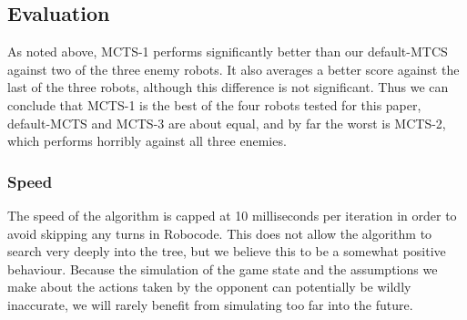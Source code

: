 \subsection{Evaluation}
As noted above, MCTS-1 performs significantly better than our default-MTCS against two of the three enemy robots. It also averages a better score against the last of the three robots, although this difference is not significant. Thus we can conclude that MCTS-1 is the best of the four robots tested for this paper, default-MCTS and MCTS-3 are about equal, and by far the worst is MCTS-2, which performs horribly against all three enemies.

\subsubsection{Speed}
The speed of the algorithm is capped at 10 milliseconds per iteration in order to avoid skipping any turns in Robocode. This does not allow the algorithm to search very deeply into the tree, but we believe this to be a somewhat positive behaviour. Because the simulation of the game state and the assumptions we make about the actions taken by the opponent can potentially be wildly inaccurate, we will rarely benefit from simulating too far into the future.
